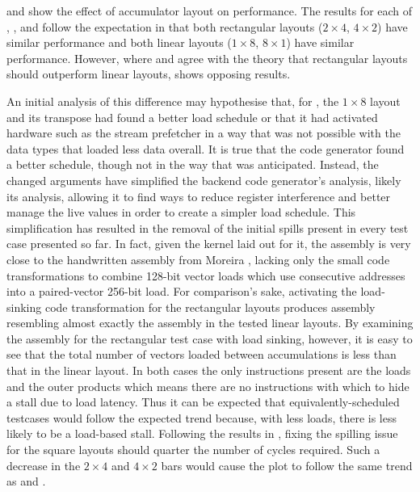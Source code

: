 \documentclass[\main/thesis.tex]{subfiles}
\begin{document}
 and  show the effect of accumulator layout on performance.
The results for each of , , and  follow the expectation in  that both rectangular layouts ($2 \times 4$, $4 \times 2$) have similar performance and both linear layouts ($1 \times 8$, $8 \times 1$) have similar performance.
However, where  and  agree with the theory that rectangular layouts should outperform linear layouts,  shows opposing results.

An initial analysis of this difference may hypothesise that, for , the $1 \times 8$ layout and its transpose had found a better load schedule or that it had activated hardware such as the stream prefetcher in a way that was not possible with the data types that loaded less data overall.
It is true that the code generator found a better schedule, though not in the way that was anticipated.
Instead, the changed arguments have simplified the backend code generator's analysis, likely its  analysis, allowing it to find ways to reduce register interference and better manage the \gls{live} values in order to create a simpler load schedule.
This simplification has resulted in the removal of the initial spills present in every test case presented so far.
In fact, given the kernel laid out for it, the assembly is very close to the handwritten assembly from Moreira \etal, lacking only the small code transformations to combine 128-bit vector loads which use consecutive addresses into a paired-vector 256-bit load.
For comparison's sake, activating the load-sinking code transformation for the rectangular layouts produces assembly resembling almost exactly the assembly in the tested linear layouts\footnotemark.
By examining the assembly for the rectangular test case with load sinking, however, it is easy to see that the total number of vectors loaded between accumulations is less than that in the linear layout.
In both cases the only instructions present are the loads and the outer products which means there are no instructions with which to hide a stall due to load latency.
Thus it can be expected that equivalently-scheduled  testcases would follow the expected trend because, with less loads, there is less likely to be a load-based stall.
Following the results in , fixing the spilling issue for the  square layouts should quarter the number of cycles required.
Such a decrease in the $2 \times 4$ and $4 \times 2$ bars would cause the  plot to follow the same trend as  and .
\end{document}
